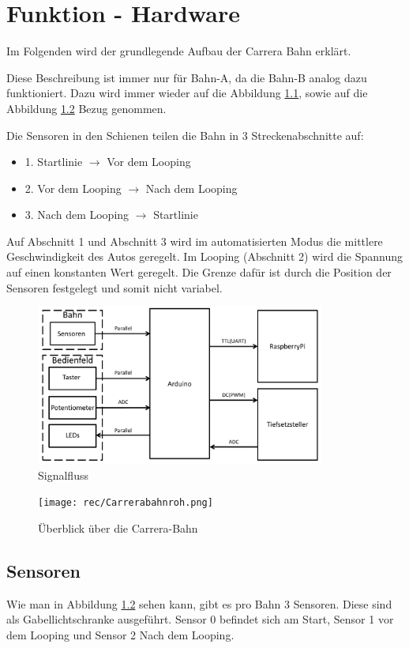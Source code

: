 \documentclass[a4paper, 11pt]{report}
\begin{document}
\chapter{Funktion - Hardware}
	Im Folgenden wird der grundlegende Aufbau der Carrera Bahn erklärt.

	Diese Beschreibung ist immer nur für Bahn-A, da die
	Bahn-B analog dazu funktioniert. Dazu wird immer wieder auf die Abbildung \ref{img:signalfluss}, sowie auf die \\Abbildung
	\ref{img:carrerakomplett} Bezug genommen.

	Die Sensoren in den Schienen teilen die Bahn in 3 Streckenabschnitte auf:
	\begin{itemize}
		\item{1.} Startlinie $\rightarrow$ Vor dem Looping
		\item{2.} Vor dem Looping $\rightarrow$ Nach dem Looping
		\item{3.} Nach dem Looping $\rightarrow$ Startlinie
	\end{itemize}
	Auf Abschnitt 1 und Abschnitt 3 wird im automatisierten Modus die mittlere Geschwindigkeit des Autos geregelt.
	Im Looping (Abschnitt 2) wird die Spannung auf einen konstanten Wert geregelt.
	Die Grenze dafür ist durch die Position der Sensoren festgelegt und somit nicht variabel.
	\begin{figure}[ht]
		\centering
		\includegraphics[width=0.85\textwidth]{rec/signalfluss.pdf}
		\caption{Signalfluss}
		\label{img:signalfluss}
	\end{figure}
	\begin{figure}[ht]
	\centering
	\texttt{[image: rec/Carrerabahnroh.png]}
	\caption{Überblick über die Carrera-Bahn}
	\label{img:carrerakomplett}
	\end{figure}
	\newpage

	\section{Sensoren}
			Wie man in Abbildung \ref{img:carrerakomplett} sehen kann, gibt es pro Bahn 3 Sensoren. Diese sind als Gabellichtschranke ausgeführt. Sensor 0 befindet sich am Start, Sensor 1 vor dem Looping und 		Sensor 2 Nach dem Looping.\\
\end{document}
